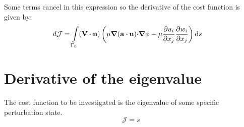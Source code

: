 \documentclass[12pt, a4paper]{article}
\begin{document}
    Some terms cancel in this expression so the derivative of the cost function is given by:
    \begin{equation}
    \begin{split}
        d \mathcal{J} = \int\limits_{\Gamma_0}(\mathbf{V \cdot n}) \, \bigg{(} &
            \mu \boldsymbol{\nabla}(\mathbf{a \cdot u}) \mathbf{\cdot} \boldsymbol{\nabla} \phi -
            \mu \frac{\partial u_i}{\partial x_j} \frac{\partial w_i}{\partial x_j}
        \bigg{)} \, \mathrm{d}s
    \end{split}
    \end{equation}
    
\section{Derivative of the eigenvalue} \label{app:eigenvalue}
    The cost function to be investigated is the eigenvalue of some specific perturbation state.
    \begin{equation}
        \mathcal{J} = s
    \end{equation}
    
\end{document}
